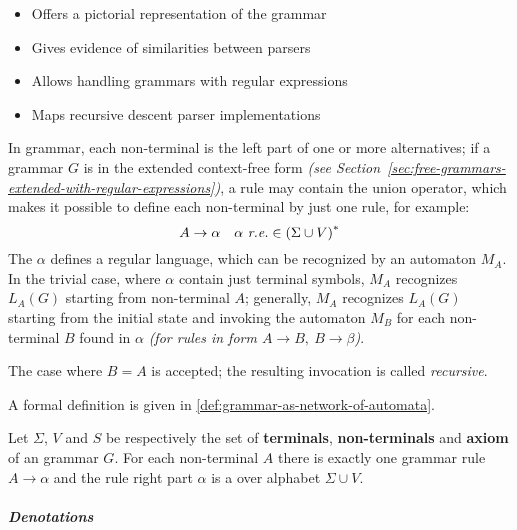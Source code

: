 \documentclass[english]{article}
\begin{document}
\begin{itemize}
  \item Offers a pictorial representation of the grammar
  \item Gives evidence of similarities between parsers
  \item Allows handling grammars with regular expressions
  \item Maps recursive descent parser implementations
\end{itemize}

\bigskip
In grammar, each non-terminal is the left part of one or more alternatives;
if a grammar \(G\) is in the extended context-free form \textit{(see Section~\ref{sec:free-grammars-extended-with-regular-expressions})}, a rule \RP may contain the union operator, which makes it possible to define each non-terminal by just one rule, for example:
\[ A \rightarrow \alpha \quad \alpha \ \textit{r.e.} \in \left( \Sigma \cup V \right)^\ast \]
The \re \(\alpha\) defines a regular language, which can be recognized by an automaton \(M_A\).
In the trivial case, where \(\alpha\) contain just terminal symbols, \(M_A\) recognizes \(L_A(G)\) starting from non-terminal \(A\);
generally, \(M_A\) recognizes \(L_A(G)\) starting from the initial state and invoking the automaton \(M_{B}\) for each non-terminal \(B\) found in \(\alpha\) \textit{(for rules in form \(A \rightarrow B,\  B \rightarrow \beta\))}.

The case where \(B = A\) is accepted; the resulting invocation is called \textit{recursive}.

\bigskip
A formal definition is given in \ref{def:grammar-as-network-of-automata}.

\begin{definition}
  \label{def:grammar-as-network-of-automata}
  Let \(\Sigma\), \(V\) and \(S\) be respectively the set of \textbf{terminals}, \textbf{non-terminals} and \textbf{axiom} of an \EBNF grammar \(G\).
  For each non-terminal \(A\) there is exactly one grammar rule \(A \rightarrow \alpha\) and the rule right part \(\alpha\) is a \re over alphabet \(\Sigma \cup V\).
\end{definition}

\subparagraph*{Denotations}
\end{document}
